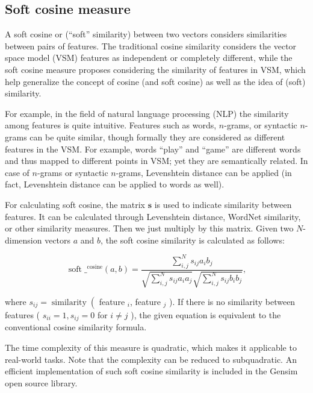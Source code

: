\documentclass[
  12 pt,
  a4paper,
]{book}
\numberwithin{equation}{section}
\theoremstyle{plain}      %
\theoremstyle{definition} %
\theoremstyle{remark}     %
\theoremstyle{note}         %
\begin{document}
\hypertarget{soft-cosine-measure}{%
\subsection{Soft cosine measure}\label{soft-cosine-measure}}

A soft cosine or (``soft'' similarity) between two vectors considers
similarities between pairs of features. The traditional cosine
similarity considers the vector space model (VSM) features as
independent or completely different, while the soft cosine measure
proposes considering the similarity of features in VSM, which help
generalize the concept of cosine (and soft cosine) as well as the idea
of (soft) similarity.

For example, in the field of natural language processing (NLP) the
similarity among features is quite intuitive. Features such as words,
\(n\)-grams, or syntactic \(n\)-grams can be quite similar, though
formally they are considered as different features in the VSM. For
example, words ``play'' and ``game'' are different words and thus mapped
to different points in VSM; yet they are semantically related. In case
of \(n\)-grams or syntactic \(n\)-grams, Levenshtein distance can be
applied (in fact, Levenshtein distance can be applied to words as well).

For calculating soft cosine, the matrix \(\mathbf{s}\) is used to
indicate similarity between features. It can be calculated through
Levenshtein distance, WordNet similarity, or other similarity measures.
Then we just multiply by this matrix. Given two \(N\)-dimension vectors
\(a\) and \(b\), the soft cosine similarity is calculated as follows:

\[
\operatorname{soft} \_^{\operatorname{cosine}}(a, b)=\frac{\sum_{i, j}^N s_{i j} a_i b_j}{\sqrt{\sum_{i, j}^N s_{i j} a_i a_j} \sqrt{\sum_{i, j}^N s_{i j} b_i b_j}},
\]

where \(s_{i j}=\operatorname{similarity}\left(\right.\) feature \(_i\),
feature \(_j\) ). If there is no similarity between features (
\(s_{i i}=1, s_{i j}=0\) for \(i \neq j\) ), the given equation is
equivalent to the conventional cosine similarity formula.

The time complexity of this measure is quadratic, which makes it
applicable to real-world tasks. Note that the complexity can be reduced
to subquadratic. An efficient implementation of such soft cosine
similarity is included in the Gensim open source library.

\newpage
\end{document}
